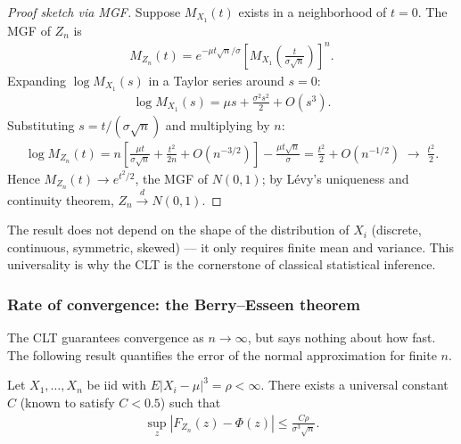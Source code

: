 \begin{proof}[Proof sketch via MGF]
Suppose $M_{X_1}(t)$ exists in a neighborhood of $t=0$. The MGF of $Z_n$ is
\begin{align}
 M_{Z_n}(t) = e^{-\mu t \sqrt{n}/\sigma}\left[M_{X_1}\!\left(\frac{t}{\sigma\sqrt{n}}\right)\right]^n.
\end{align}
Expanding $\log M_{X_1}(s)$ in a Taylor series around $s=0$:
\begin{align}
 \log M_{X_1}(s) = \mu s + \frac{\sigma^2 s^2}{2} + O(s^3).
\end{align}
Substituting $s = t/(\sigma\sqrt{n})$ and multiplying by $n$:
\begin{align}
 \log M_{Z_n}(t) = n\left[\frac{\mu t}{\sigma\sqrt{n}} + \frac{t^2}{2n} + O(n^{-3/2})\right]
 - \frac{\mu t\sqrt{n}}{\sigma} = \frac{t^2}{2} + O(n^{-1/2}) \;\longrightarrow\; \frac{t^2}{2}.
\end{align}
Hence $M_{Z_n}(t) \to e^{t^2/2}$, the MGF of $N(0,1)$; by L\'evy's uniqueness and continuity theorem, $Z_n \xrightarrow{d} N(0,1)$.
\end{proof}

\begin{observacion}
The result does not depend on the shape of the distribution of $X_i$ (discrete, continuous, symmetric, skewed) --- it only requires finite mean and variance. This universality is why the CLT is the cornerstone of classical statistical inference.
\end{observacion}

\subsubsection{Rate of convergence: the Berry--Esseen theorem}

The CLT guarantees convergence as $n \to \infty$, but says nothing about how fast. The following result quantifies the error of the normal approximation for finite $n$.

\begin{teorema}
 \label{eq:5.2.2}
Let $X_1,\ldots,X_n$ be iid with $E|X_i-\mu|^3 = \rho < \infty$. There exists a universal constant $C$ (known to satisfy $C < 0.5$) such that
\begin{align}
 \sup_z \left|F_{Z_n}(z) - \Phi(z)\right| \le \frac{C\rho}{\sigma^3\sqrt{n}}.
\end{align}
\end{teorema}

